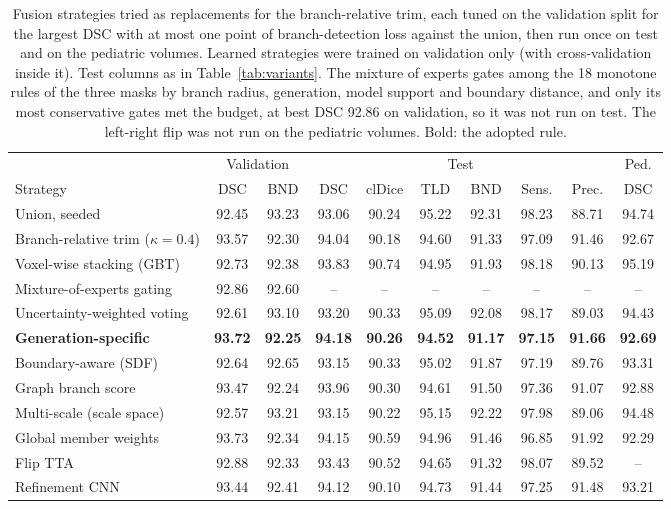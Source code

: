 \documentclass[runningheads]{llncs}
\begin{document}
\begin{table}[tbp]
\centering
\caption{Fusion strategies tried as replacements for the branch-relative trim,
each tuned on the validation split for the largest DSC with at most one point
of branch-detection loss against the union, then run once on test and on the
pediatric volumes. Learned strategies were trained on validation only (with
cross-validation inside it). Test columns as in Table~\ref{tab:variants}.
The mixture of experts gates among the 18 monotone rules of the three masks by
branch radius, generation, model support and boundary distance, and only its
most conservative gates met the budget, at best DSC 92.86 on validation, so it
was not run on test. The
left-right flip was not run on the pediatric volumes. Bold: the adopted rule.}
\label{tab:ablation}
\setlength{\tabcolsep}{2.4pt}\scriptsize
\begin{tabular}{@{}lccccccccc@{}}
\toprule
 & \multicolumn{2}{c}{Validation} & \multicolumn{6}{c}{Test} & Ped. \\
\cmidrule(lr){2-3}\cmidrule(lr){4-9}\cmidrule(lr){10-10}
Strategy & DSC & BND & DSC & clDice & TLD & BND & Sens. & Prec. & DSC \\
\midrule
Union, seeded & 92.45 & 93.23 & 93.06 & 90.24 & 95.22 & 92.31 & 98.23 & 88.71 & 94.74 \\
Branch-relative trim ($\kappa=0.4$) & 93.57 & 92.30 & 94.04 & 90.18 & 94.60 & 91.33 & 97.09 & 91.46 & 92.67 \\
\midrule
Voxel-wise stacking (GBT) & 92.73 & 92.38 & 93.83 & 90.74 & 94.95 & 91.93 & 98.18 & 90.13 & 95.19 \\
Mixture-of-experts gating & 92.86 & 92.60 & -- & -- & -- & -- & -- & -- & -- \\
Uncertainty-weighted voting & 92.61 & 93.10 & 93.20 & 90.33 & 95.09 & 92.08 & 98.17 & 89.03 & 94.43 \\
\textbf{Generation-specific} & \textbf{93.72} & \textbf{92.25} & \textbf{94.18} & \textbf{90.26} & \textbf{94.52} & \textbf{91.17} & \textbf{97.15} & \textbf{91.66} & \textbf{92.69} \\
Boundary-aware (SDF) & 92.64 & 92.65 & 93.15 & 90.33 & 95.02 & 91.87 & 97.19 & 89.76 & 93.31 \\
Graph branch score & 93.47 & 92.24 & 93.96 & 90.30 & 94.61 & 91.50 & 97.36 & 91.07 & 92.88 \\
Multi-scale (scale space) & 92.57 & 93.21 & 93.15 & 90.22 & 95.15 & 92.22 & 97.98 & 89.06 & 94.48 \\
Global member weights & 93.73 & 92.34 & 94.15 & 90.59 & 94.96 & 91.46 & 96.85 & 91.92 & 92.29 \\
Flip TTA & 92.88 & 92.33 & 93.43 & 90.52 & 94.65 & 91.32 & 98.07 & 89.52 & -- \\
Refinement CNN & 93.44 & 92.41 & 94.12 & 90.10 & 94.73 & 91.44 & 97.25 & 91.48 & 93.21 \\
\bottomrule
\end{tabular}
\end{table}
\end{document}
